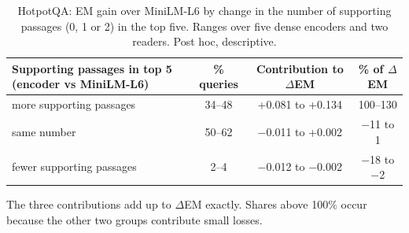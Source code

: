 \begin{table}[t]
\centering
\small
\caption{HotpotQA: EM gain over MiniLM-L6 by change in the number of supporting passages (0, 1 or 2) in the top five. Ranges over five dense encoders and two readers. Post hoc, descriptive.}
\label{tab:hpevidence}
\begin{tabular}{lccc}
\toprule
Supporting passages in top 5 (encoder vs MiniLM-L6) & \% queries & Contribution to $\Delta$EM & \% of $\Delta$EM \\
\midrule
more supporting passages & 34--48 & +0.081 to +0.134 & 100--130 \\
same number & 50--62 & \ensuremath{-}0.011 to +0.002 & \ensuremath{-}11 to 1 \\
fewer supporting passages & 2--4 & \ensuremath{-}0.012 to \ensuremath{-}0.002 & \ensuremath{-}18 to \ensuremath{-}2 \\
\bottomrule
\end{tabular}
\par\smallskip\parbox{\linewidth}{\footnotesize The three contributions add up to $\Delta$EM exactly. Shares above 100\% occur because the other two groups contribute small losses.}
\end{table}
